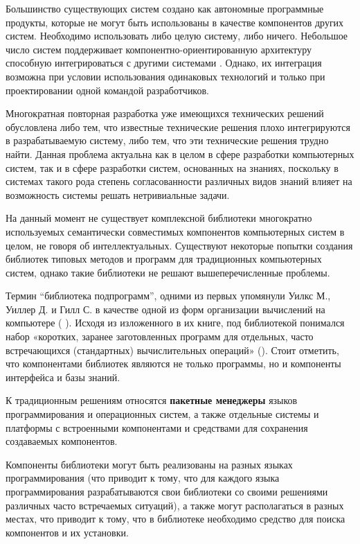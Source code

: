 Большинство существующих систем создано как автономные программные продукты, которые не могут быть использованы в качестве компонентов других систем. Необходимо использовать либо целую систему, либо ничего. Небольшое число систем поддерживает компонентно-ориентированную архитектуру способную интегрироваться с другими системами  . Однако, их интеграция возможна при условии использования одинаковых технологий и только при проектировании одной командой разработчиков.

Многократная повторная разработка уже имеющихся технических решений обусловлена либо тем, что известные технические решения плохо интегрируются в разрабатываемую систему, либо тем, что эти технические решения трудно найти. Данная проблема актуальна как в целом в сфере разработки компьютерных систем, так и в сфере разработки систем, основанных на знаниях, поскольку в системах такого рода степень согласованности различных видов знаний влияет на возможность системы решать нетривиальные задачи.

На данный момент не существует комплексной библиотеки многократно используемых семантически совместимых компонентов компьютерных систем в целом, не говоря об интеллектуальных. Существуют некоторые попытки создания библиотек типовых методов и программ для традиционных компьютерных систем, однако такие библиотеки не решают вышеперечисленные проблемы.

Термин ``библиотека подпрограмм'', одними из первых упомянули Уилкс М., Уиллер Д. и Гилл С. в качестве одной из форм организации вычислений на компьютере ( ). Исходя из изложенного в их книге, под библиотекой понимался набор «коротких, заранее заготовленных программ для отдельных, часто встречающихся (стандартных) вычислительных операций» (). Стоит отметить, что компонентами библиотек являются не только программы, но и компоненты интерфейса и базы знаний.

К традиционным решениям относятся \textbf{пакетные менеджеры} языков программирования и операционных систем, а также отдельные системы и платформы с встроенными компонентами и средствами для сохранения создаваемых компонентов.

Компоненты библиотеки могут быть реализованы на разных языках программирования (что приводит к тому, что для каждого языка программирования разрабатываются свои библиотеки со своими решениями различных часто встречаемых ситуаций), а также могут располагаться в разных местах, что приводит к тому, что в библиотеке необходимо средство для поиска компонентов и их установки.

